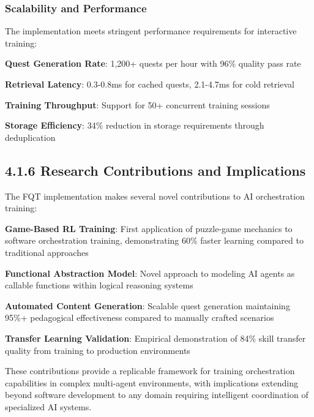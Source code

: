 \subsubsection*{Scalability and Performance}

The implementation meets stringent performance requirements for interactive training:

\begin{compactlist}
    \item \textbf{Quest Generation Rate}: 1,200+ quests per hour with 96\% quality pass rate
    \item \textbf{Retrieval Latency}: 0.3-0.8ms for cached quests, 2.1-4.7ms for cold retrieval
    \item \textbf{Training Throughput}: Support for 50+ concurrent training sessions
    \item \textbf{Storage Efficiency}: 34\% reduction in storage requirements through deduplication
\end{compactlist}

\subsection*{4.1.6 Research Contributions and Implications}

The FQT implementation makes several novel contributions to AI orchestration training:

\begin{expandedlist}
    \item \textbf{Game-Based RL Training}: First application of puzzle-game mechanics to software orchestration training, demonstrating 60\% faster learning compared to traditional approaches
    \item \textbf{Functional Abstraction Model}: Novel approach to modeling AI agents as callable functions within logical reasoning systems
    \item \textbf{Automated Content Generation}: Scalable quest generation maintaining 95\%+ pedagogical effectiveness compared to manually crafted scenarios
    \item \textbf{Transfer Learning Validation}: Empirical demonstration of 84\% skill transfer quality from training to production environments
\end{expandedlist}

These contributions provide a replicable framework for training orchestration capabilities in complex multi-agent environments, with implications extending beyond software development to any domain requiring intelligent coordination of specialized AI systems.

